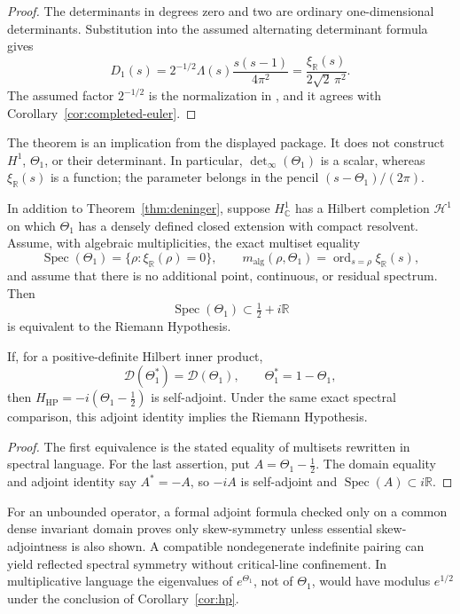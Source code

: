 \begin{proof}
The determinants in degrees zero and two are ordinary one-dimensional
determinants.  Substitution into the assumed alternating determinant formula
gives
\[
 D_1(s)=2^{-1/2}\Lambda(s)\frac{s(s-1)}{4\pi^2}
 =\frac{\xi_{\mathbb R}(s)}{2\sqrt2\,\pi^2}.
\]
The assumed factor $2^{-1/2}$ is the normalization in
\cite[\S3, equation~(3)]{Deninger1998}, and it agrees with
Corollary~\ref{cor:completed-euler}.
\end{proof}

The theorem is an implication from the displayed package.  It does not
construct \(H^1\), \(\Theta_1\), or their determinant.  In particular,
\(\det_\infty(\Theta_1)\) is a scalar, whereas
\(\xi_{\mathbb R}(s)\) is a function; the parameter belongs in the pencil
\((s-\Theta_1)/(2\pi)\).

\begin{corollary}
\label{cor:hp}
In addition to Theorem~\ref{thm:deninger}, suppose \(H^1_{\mathbb C}\) has a
Hilbert completion \(\mathscr H^1\) on which \(\Theta_1\) has a densely
defined closed extension with compact resolvent.  Assume, with algebraic
multiplicities, the exact multiset equality
\[
 \operatorname{Spec}(\Theta_1)
 =\{\rho:\xi_{\mathbb R}(\rho)=0\},
 \qquad
 m_{\mathrm{alg}}(\rho,\Theta_1)
 =\operatorname{ord}_{s=\rho}\xi_{\mathbb R}(s),
\]
and assume that there is no additional point, continuous, or residual
spectrum.  Then
\[
 \operatorname{Spec}(\Theta_1)\subset\tfrac12+i\mathbb R
\]
is equivalent to the Riemann Hypothesis.

If, for a positive-definite Hilbert inner product,
\[
 \mathcal D(\Theta_1^*)=\mathcal D(\Theta_1),
 \qquad \Theta_1^*=1-\Theta_1,
\]
then \(H_{\mathrm{HP}}=-i(\Theta_1-\tfrac12)\) is self-adjoint.  Under the
same exact spectral comparison, this adjoint identity implies the Riemann
Hypothesis.
\end{corollary}

\begin{proof}
The first equivalence is the stated equality of multisets rewritten in
spectral language.  For the last assertion, put
\(A=\Theta_1-\tfrac12\).  The domain equality and adjoint identity say
\(A^*=-A\), so \(-iA\) is self-adjoint and
\(\operatorname{Spec}(A)\subset i\mathbb R\).
\end{proof}

For an unbounded operator, a formal adjoint formula checked only on a common
dense invariant domain proves only skew-symmetry unless essential
skew-adjointness is also shown. A compatible nondegenerate indefinite
pairing can yield reflected spectral symmetry without critical-line
confinement. In multiplicative language the eigenvalues
of \(e^{\Theta_1}\), not of \(\Theta_1\), would have modulus
\(e^{1/2}\) under the conclusion of Corollary~\ref{cor:hp}.
